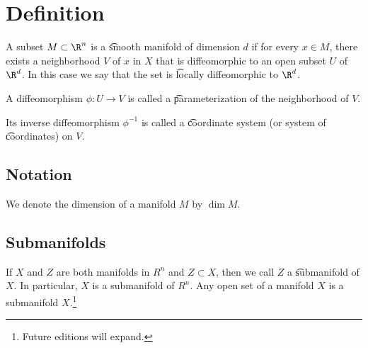 
\section*{Definition}

A subset $M \subset \R ^n$ is a \t{smooth manifold} of dimension $d$ if for every $x \in M$, there exists a neighborhood $V$ of $x$ in $X$ that is diffeomorphic to an open subset $U$ of $\R ^d$.
In this case we say that the set is \t{locally diffeomorphic} to $\R ^d$.

A diffeomorphism $\phi : U \to V$ is called a \t{parameterization} of the neighborhood of $V$.

Its inverse diffeomorphism $\phi ^{-1}$ is called a \t{coordinate system} (or system of \t{coordinates}) on $V$.

\subsection*{Notation}

We denote the dimension of a manifold $M$ by $\dim M$.

\subsection*{Submanifolds}

If $X$ and $Z$ are both manifolds in $R^n$ and $Z \subset X$, then we call $Z$ a \t{submanifold} of $X$.
In particular, $X$ is a submanifold of $R^n$.
Any open set of a manifold $X$ is a submanifold $X$.\footnote{Future editions will expand.}

\blankpage